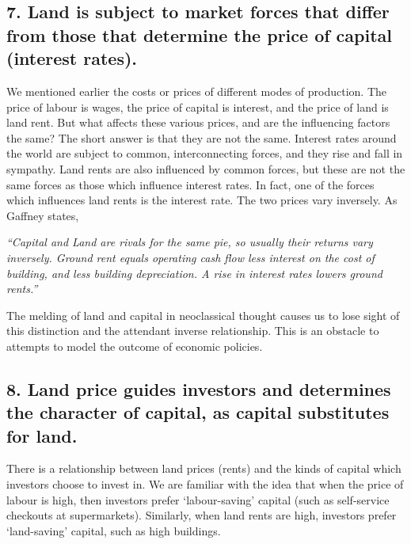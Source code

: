 \documentclass[]{tufte-handout}
\begin{document}
\hypertarget{land-is-subject-to-market-forces-that-differ-from-those-that-determine-the-price-of-capital-interest-rates.}{%
\subsection{7. Land is subject to market forces that differ from those
that determine the price of capital (interest
rates).}\label{land-is-subject-to-market-forces-that-differ-from-those-that-determine-the-price-of-capital-interest-rates.}}

We mentioned earlier the costs or prices of different modes of
production. The price of labour is wages, the price of capital is
interest, and the price of land is land rent. But what affects these
various prices, and are the influencing factors the same? The short
answer is that they are not the same. Interest rates around the world
are subject to common, interconnecting forces, and they rise and fall in
sympathy. Land rents are also influenced by common forces, but these are
not the same forces as those which influence interest rates. In fact,
one of the forces which influences land rents is the interest rate. The
two prices vary inversely. As Gaffney states,

\emph{``Capital and Land are rivals for the same pie, so usually their
returns vary inversely. Ground rent equals operating cash flow less
interest on the cost of building, and less building depreciation. A rise
in interest rates lowers ground rents.''}

The melding of land and capital in neoclassical thought causes us to
lose sight of this distinction and the attendant inverse relationship.
This is an obstacle to attempts to model the outcome of economic
policies.

\hypertarget{land-price-guides-investors-and-determines-the-character-of-capital-as-capital-substitutes-for-land.}{%
\subsection{8. Land price guides investors and determines the character
of capital, as capital substitutes for
land.}\label{land-price-guides-investors-and-determines-the-character-of-capital-as-capital-substitutes-for-land.}}

There is a relationship between land prices (rents) and the kinds of
capital which investors choose to invest in. We are familiar with the
idea that when the price of labour is high, then investors prefer
`labour-saving' capital (such as self-service checkouts at
supermarkets). Similarly, when land rents are high, investors prefer
`land-saving' capital, such as high buildings.
\end{document}
